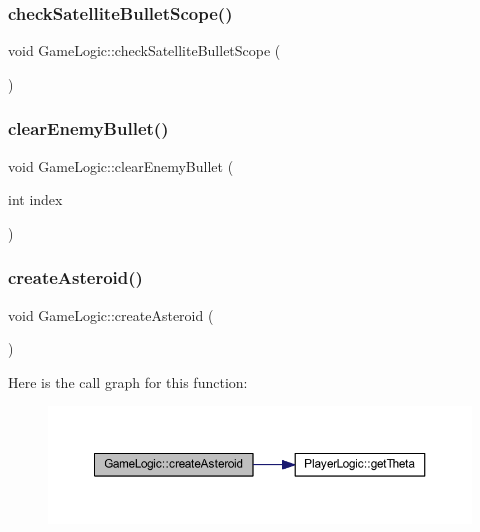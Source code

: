 \subsubsection{\texorpdfstring{check\+Satellite\+Bullet\+Scope()}{checkSatelliteBulletScope()}}
{\footnotesize\ttfamily void Game\+Logic\+::check\+Satellite\+Bullet\+Scope (\begin{DoxyParamCaption}{ }\end{DoxyParamCaption})}

\mbox{\label{class_game_logic_aa8b94076dcd3ad6419c50d0036af97d6}} 
\subsubsection{\texorpdfstring{clear\+Enemy\+Bullet()}{clearEnemyBullet()}}
{\footnotesize\ttfamily void Game\+Logic\+::clear\+Enemy\+Bullet (\begin{DoxyParamCaption}\item[{int}]{index }\end{DoxyParamCaption})}

\mbox{\label{class_game_logic_ad9b8589c1559ac09ae5674c5c87be600}} 
\subsubsection{\texorpdfstring{create\+Asteroid()}{createAsteroid()}}
{\footnotesize\ttfamily void Game\+Logic\+::create\+Asteroid (\begin{DoxyParamCaption}{ }\end{DoxyParamCaption})}

Here is the call graph for this function\+:\nopagebreak
\begin{figure}[H]
\begin{center}
\leavevmode
\includegraphics[width=350pt]{class_game_logic_ad9b8589c1559ac09ae5674c5c87be600_cgraph}
\end{center}
\end{figure}
\mbox{\label{class_game_logic_ad88d3d16d008722d8a85449beb1ed589}} 
